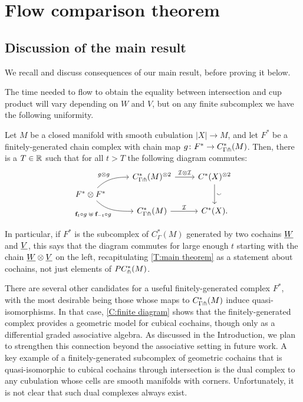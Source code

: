 
\section{Flow comparison theorem}\label{S:flow comparison theorem}

\subsection{Discussion of the main result}

We recall and discuss consequences of our main result, before proving it below.
\maintheorem*

The time needed to flow to obtain the equality between intersection and cup product will vary depending on $W$ and $V$, but on any finite subcomplex we have the following uniformity.

\begin{corollary}\label{C:finite diagram}
	Let $M$ be a closed manifold with smooth cubulation $|X| \to M$, and let $F^*$ be a finitely-generated chain complex with chain map $g \colon F^*\to C^*_{\Gamma \pitchfork}(M)$.
	Then, there is a $T \in \mathbb{R}$ such that for all $t > T$ the following diagram commutes:
	\[
	\begin{tikzcd} [row sep=tiny]
		& C^*_{\Gamma \pf}(M)^{\otimes 2} \arrow[r, "\cI \otimes \cI"] & \cochains(X)^{\otimes 2} \arrow[dd, "\sms"] \\
		F^*\otimes F^* \arrow[ur, in=180, out=45,"g\otimes g"] \arrow[dr, in=180, out=-45, "\f_t \circ g \; \uplus \; \f_{-t} \circ g"']& & \\
		& C^*_{\Gamma \pf}(M) \arrow[r, "\cI"] & \cochains(X).
	\end{tikzcd}
	\]
\end{corollary}

In particular, if $F^*$ is the subcomplex of $C^*_\Gamma(M)$ generated by two cochains $\underline{W}$ and $\underline{V}$, this says that the diagram commutes for large enough $t$ starting with the chain $\underline{W}\otimes\underline{V}$ on the left, recapitulating \cref{T:main theorem} as a statement about cochains, not just elements of $PC_\pitchfork^*(M)$.

There are several other candidates for a useful finitely-generated complex $F^*$, with the most desirable being those whose maps to $C^*_{\Gamma \pitchfork}(M)$ induce quasi-isomorphisms.
In that case, \cref{C:finite diagram} shows that the finitely-generated complex provides a geometric model for cubical cochains, though only as a differential graded associative algebra.
As discussed in the Introduction, we plan to strengthen this connection beyond the associative setting in future work.
A key example of a finitely-generated subcomplex of geometric cochains that is quasi-isomorphic to cubical cochains through intersection
is the dual complex to any cubulation whose cells are smooth manifolds with corners.
Unfortunately, it is not clear that such dual complexes always exist.


